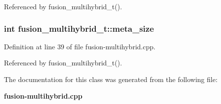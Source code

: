 Referenced by fusion\_\-multihybrid\_\-t().
\subsubsection[{meta\_\-size}]{\setlength{\rightskip}{0pt plus 5cm}int {\bf fusion\_\-multihybrid\_\-t::meta\_\-size}\hspace{0.3cm}{\tt  [protected]}}\label{classfusion__multihybrid__t_b7eaeebb0406c6005d1d80b15da0e09f}




Definition at line 39 of file fusion-multihybrid.cpp.

Referenced by fusion\_\-multihybrid\_\-t().

The documentation for this class was generated from the following file:\begin{CompactItemize}
\item 
{\bf fusion-multihybrid.cpp}\end{CompactItemize}
